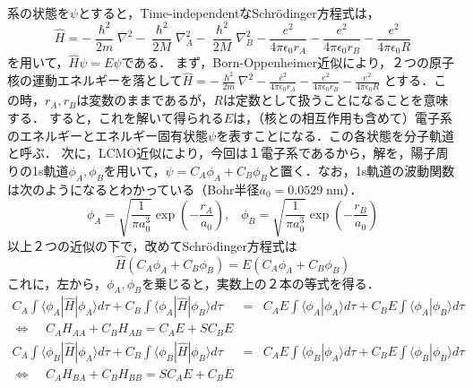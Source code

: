 \documentclass[uplatex, dvipdfmx]{jsreport}
\begin{document}
\begin{example}　

    \begin{center}
    \end{center}
    系の状態を$\psi$とすると，Time-independentなSchrödinger方程式は，
    \[ \hat{H}= -\frac{\hslash^2}{2m}\nabla^2 - \frac{\hslash^2}{2M}\nabla^2_A  - \frac{\hslash^2}{2M}\nabla^2_B  - \frac{e^2}{4\pi\epsilon_0r_A}- \frac{e^2}{4\pi\epsilon_0r_B}- \frac{e^2}{4\pi\epsilon_0R} \]
    を用いて，$\hat{H}\psi=E\psi$である．
    まず，Born-Oppenheimer近似により，２つの原子核の運動エネルギーを落として$\hat{H}=  -\frac{\hslash^2}{2m}\nabla^2  - \frac{e^2}{4\pi\epsilon_0r_A}- \frac{e^2}{4\pi\epsilon_0r_B}- \frac{e^2}{4\pi\epsilon_0R}$
    とする．この時，$r_A,r_B$は変数のままであるが，$R$は定数として扱うことになることを意味する．
    すると，これを解いて得られる$E$は，（核との相互作用も含めて）電子系のエネルギーとエネルギー固有状態$\psi$を表すことになる．この各状態を分子軌道と呼ぶ．
    次に，LCMO近似により，今回は１電子系であるから，解を，陽子周りの1s軌道$\phi_A,\phi_B$を用いて，$\psi=C_A\phi_A+C_B\phi_B$と置く．なお，1s軌道の波動関数は次のようになるとわかっている（Bohr半径$a_0=0.0529\;\mathrm{nm}$）．
    \[ \phi_A=\sqrt{\frac{1}{\pi a_0^3}}\exp\left( -\frac{r_A}{a_0} \right),\;\;\; \phi_B=\sqrt{\frac{1}{\pi a_0^3}}\exp\left( -\frac{r_B}{a_0} \right)  \]
    以上２つの近似の下で，改めてSchrödinger方程式は
    \[ \hat{H}(C_A\phi_A+C_B\phi_B)=E(C_A\phi_A+C_B\phi_B) \]
    これに，左から，$\phi_A,\phi_B$を乗じると，実数上の２本の等式を得る．
    \begin{eqnarray*}
        C_A\int \langle\phi_A|\hat{H}|\phi_A\rangle d\tau + C_B\int \langle\phi_A|\hat{H}|\phi_B\rangle d\tau &=& C_AE\int \langle\phi_A|\phi_A\rangle d\tau + C_BE\int \langle\phi_A|\phi_B\rangle d\tau \\
        \Leftrightarrow\;\;\;\; C_AH_{AA}+C_BH_{AB} = C_AE+SC_BE \\
        C_A\int \langle\phi_B|\hat{H}|\phi_A\rangle d\tau + C_B\int \langle\phi_B|\hat{H}|\phi_B\rangle d\tau &=& C_AE\int \langle\phi_B|\phi_A\rangle d\tau + C_BE\int \langle\phi_B|\phi_B\rangle d\tau \\
        \Leftrightarrow\;\;\;\; C_AH_{BA}+C_BH_{BB} = SC_AE+C_BE

\end{eqnarray*}
\end{example}
\end{document}
